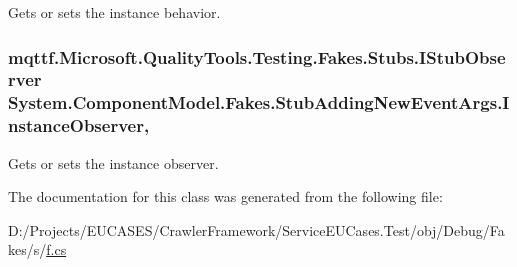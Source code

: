 Gets or sets the instance behavior.

\hypertarget{class_system_1_1_component_model_1_1_fakes_1_1_stub_adding_new_event_args_a729431faae6880462d0d896543cd6f57}{
\subsubsection[{Instance\-Observer}]{\setlength{\rightskip}{0pt plus 5cm}mqttf.\-Microsoft.\-Quality\-Tools.\-Testing.\-Fakes.\-Stubs.\-I\-Stub\-Observer System.\-Component\-Model.\-Fakes.\-Stub\-Adding\-New\-Event\-Args.\-Instance\-Observer\hspace{0.3cm}{\ttfamily [get]}, {\ttfamily [set]}}}\label{class_system_1_1_component_model_1_1_fakes_1_1_stub_adding_new_event_args_a729431faae6880462d0d896543cd6f57}


Gets or sets the instance observer.



The documentation for this class was generated from the following file\-:\begin{DoxyCompactItemize}
\item 
D\-:/\-Projects/\-E\-U\-C\-A\-S\-E\-S/\-Crawler\-Framework/\-Service\-E\-U\-Cases.\-Test/obj/\-Debug/\-Fakes/s/\hyperlink{s_2f_8cs}{f.\-cs}\end{DoxyCompactItemize}
